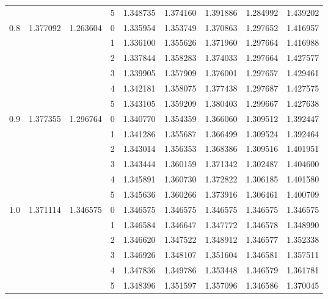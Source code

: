 \begin{tabular}{llllrrrrr}
    &          &          & 5 &  1.348735 &  1.374160 &  1.391886 &  1.284992 &  1.439202 \\
0.8 & 1.377092 & 1.263604 & 0 &  1.335954 &  1.353749 &  1.370863 &  1.297652 &  1.416957 \\
    &          &          & 1 &  1.336100 &  1.355626 &  1.371960 &  1.297664 &  1.416988 \\
    &          &          & 2 &  1.337844 &  1.358283 &  1.374033 &  1.297664 &  1.427577 \\
    &          &          & 3 &  1.339905 &  1.357909 &  1.376001 &  1.297657 &  1.429461 \\
    &          &          & 4 &  1.342181 &  1.358075 &  1.377438 &  1.297687 &  1.427575 \\
    &          &          & 5 &  1.343105 &  1.359209 &  1.380403 &  1.299667 &  1.427638 \\
0.9 & 1.377355 & 1.296764 & 0 &  1.340770 &  1.354359 &  1.366060 &  1.309512 &  1.392447 \\
    &          &          & 1 &  1.341286 &  1.355687 &  1.366499 &  1.309524 &  1.392464 \\
    &          &          & 2 &  1.343014 &  1.356353 &  1.368386 &  1.309516 &  1.401951 \\
    &          &          & 3 &  1.343444 &  1.360159 &  1.371342 &  1.302487 &  1.404600 \\
    &          &          & 4 &  1.345891 &  1.360730 &  1.372822 &  1.306185 &  1.401580 \\
    &          &          & 5 &  1.345636 &  1.360266 &  1.373916 &  1.306461 &  1.400709 \\
1.0 & 1.371114 & 1.346575 & 0 &  1.346575 &  1.346575 &  1.346575 &  1.346575 &  1.346575 \\
    &          &          & 1 &  1.346584 &  1.346647 &  1.347772 &  1.346578 &  1.348990 \\
    &          &          & 2 &  1.346620 &  1.347522 &  1.348912 &  1.346577 &  1.352338 \\
    &          &          & 3 &  1.346926 &  1.348107 &  1.351604 &  1.346581 &  1.357511 \\
    &          &          & 4 &  1.347836 &  1.349786 &  1.353448 &  1.346579 &  1.361781 \\
    &          &          & 5 &  1.348396 &  1.351597 &  1.357096 &  1.346586 &  1.370045 \\
\bottomrule
\end{tabular}
